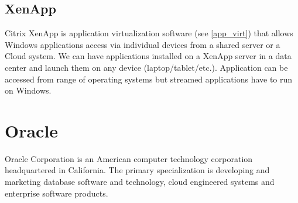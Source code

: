 \subsection{XenApp}
Citrix XenApp is application virtualization software (see \ref{app_virt}) that allows Windows applications access via individual devices from a shared server or a Cloud system. We can have applications installed on a XenApp server in a data center and launch them on any device (laptop/tablet/etc.). Application can be accessed from range of operating systems but streamed applications have to run on Windows.


\section{Oracle}
Oracle Corporation is an American computer technology corporation headquartered in California. The primary specialization is developing and marketing database software and technology, cloud engineered systems and enterprise software products.

